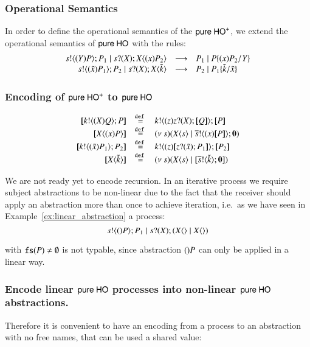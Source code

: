 \subsubsection{Operational Semantics}
In order to define the operational semantics of the $\mathsf{pure\ HO}^+$,
we extend the operational semantics of $\mathsf{pure\ HO}$ with the rules:
%
\[
	\begin{array}{rcl}
		s ! \langle (Y)P \rangle ; P_1 \;|\; s ? (X) ; X\langle (x)P_2 \rangle &\longrightarrow& P_1 \;|\; P \{(x)P_2/Y \}\\
		s ! \langle (\tilde{x})P_1 \rangle ; P_2 \;|\; s ? (X) ; X\langle \tilde{k} \rangle &\longrightarrow& P_2 \;|\; P_1\{\tilde{k}/\tilde{x} \}
	\end{array}
\]
%
\subsubsection{Encoding of $\mathsf{pure\ HO}^+$ to $\mathsf{pure\ HO}$}
%
\[
	\begin{array}{rcl}
		\map{\bout{k}{\abs{\X} Q} P}	&\defeq&	\bout{k}{\abs{z} \binp{z}{\X} \map{Q}} \map{P}\\
		\map{\appl{X}{\abs{x} P}}	&\defeq&	\newsp{s}{\appl{X}{s} \Par \bout{\dual{s}}{\abs{x}{\map{P}}} \inact}\\

		\map{\bout{k}{\abs{\tilde{x}}{P_1}} P_2}	&\defeq&	\bout{k}{ \abs{z}{ \map{ \binp{z}{\tilde{x}} P_1} } } \map{P_2}\\
		\map{\appl{\X}{\tilde{k}}}			&\defeq&	\newsp{s}{\appl{\X}{s} \Par \map{\bout{\dual{s}}{\tilde{k}} \inact}}\\
	\end{array}
\]

We are not ready yet to encode recursion. In an iterative process we require
subject abstractions to be non-linear due to the fact that the receiver should
apply an abstraction more than once to achieve iteration,
i.e.~as we have seen in Example~\ref{ex:linear_abstraction} a process:
\[
	s ! \langle ()P \rangle ; P_1 \;|\; s ? (X) ; (X\langle  \rangle \;|\; X\langle  \rangle)
\]

with $\mathtt{fs}(P) \not= \emptyset$ is not typable, since abstraction $()P$
can only be applied in a linear way.

\subsubsection{Encode linear $\mathsf{pure\ HO}$ processes into non-linear $\mathsf{pure\ HO}$ abstractions.}

Therefore it is convenient to have an encoding from a process to an abstraction
with no free names, that can be used a shared value:

